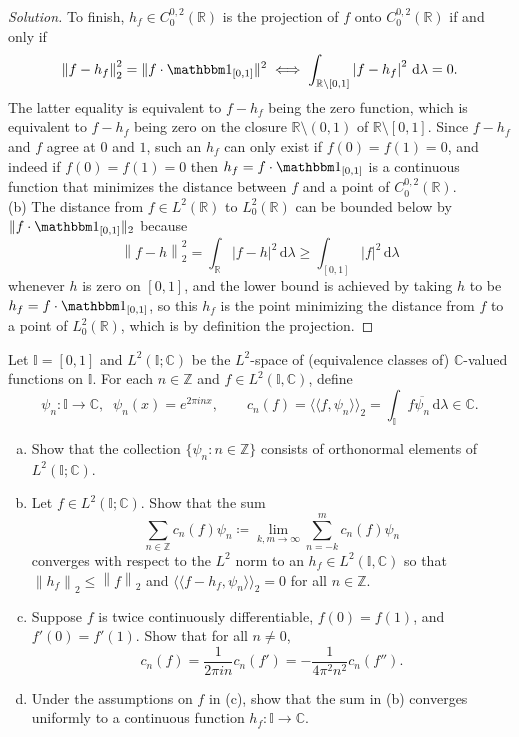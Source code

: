 \documentclass[10pt]{article}
\providecommand{\ol}{\overline}
\newcommand{\dd}{\,\mathrm{d}}
\providecommand{\CC}{\mathbb C}
\providecommand{\RR}{\mathbb R}
\providecommand{\ZZ}{\mathbb Z}
\providecommand{\ind}{\mathbbm 1}
\providecommand{\ii}{\item}
\newenvironment{soln}{\begin{proof}[Solution]}{\end{proof}}
\providecommand{\abs}[1]{\left\lvert #1\right\rvert}
\providecommand{\innerprod}[1]{\langle\!\langle #1\rangle\!\rangle}
\providecommand{\norm}[1]{\left\| #1\right\|}
\providecommand{\smnorm}[1]{\| #1\|}
\begin{document}
\begin{soln}
    To finish, $h_f\in C_0^{0,2}(\RR)$ is the projection of $f$ onto $C_0^{0,2}(\RR)$
    if and only if
    \begin{equation*}
	\norm{f-h_f}_2^2 = \smnorm{f\cdot\ind_{[0,1]}}^2
	\iff \int_{\RR\setminus[0,1]} \abs{f-h_f}^2\dd\lambda = 0.
    \end{equation*}
    The latter equality is equivalent to $f-h_f$ being the zero function,
    which is equivalent to $f-h_f$ being zero
    on the closure $\RR\setminus(0,1)$ of $\RR\setminus[0,1]$.
    Since $f-h_f$ and $f$ agree at $0$ and $1$, such an $h_f$
    can only exist if $f(0) = f(1) = 0$,
    and indeed if $f(0) = f(1) = 0$ then $h_f = f\cdot\ind_{[0,1]}$
    is a continuous function that
    minimizes the distance between $f$ and a point of $C_0^{0,2}(\RR)$.
    \\

    (b) The distance from $f\in L^2(\RR)$ to $L_0^2(\RR)$
    can be bounded below by $\smnorm{f\cdot\ind_{[0,1]}}_2$ because
    \[
	\norm{f-h}_2^2 = \int_\RR\abs{f-h}^2\dd\lambda
	\ge \int_{[0,1]} \abs{f}^2\dd\lambda
    \]
    whenever $h$ is zero on $[0,1]$,
    and the lower bound is achieved by taking $h$
    to be $h_f = f\cdot\ind_{[0,1]}$, so this $h_f$ is the point
    minimizing the distance from $f$ to a point of $L_0^2(\RR)$,
    which is by definition the projection.
\end{soln}

\begin{problem}
    Let $\mathbb I = [0,1]$ and $L^2(\mathbb I;\CC)$ be the $L^2$-space
    of (equivalence classes of) $\CC$-valued functions on $\mathbb I$.
    For each $n\in\ZZ$ and $f\in L^2(\mathbb I,\CC)$, define
    \begin{equation}
	\psi_n\colon\mathbb I\to\CC,\;\;\psi_n(x) = e^{2\pi i nx},\qquad
	c_n(f) = \innerprod{f,\psi_n}_2
	= \int_{\mathbb I} f\ol{\psi_n}\dd\lambda\in\CC.
	\label{eq:p4-assumptions}
    \end{equation}
    \begin{enumerate}[(a)]
	\ii Show that the collection $\{\psi_n : n\in\ZZ\}$
	consists of orthonormal elements of $L^2(\mathbb I;\CC)$.
	\ii Let $f\in L^2(\mathbb I;\CC)$. Show that the sum
	\begin{equation*}
	    \sum_{n\in\ZZ} c_n(f)\psi_n\coloneq
	    \lim_{k,m\to\infty}\sum_{n=-k}^m c_n(f)\psi_n
	\end{equation*}
	converges with respect to the $L^2$ norm
	to an $h_f\in L^2(\mathbb I,\CC)$ so that
	$\norm{h_f}_2\le\norm{f}_2$ and
	$\innerprod{f-h_f,\psi_n}_2 = 0$ for all $n\in\ZZ$.
	\ii Suppose $f$ is twice continuously differentiable,
	$f(0) = f(1)$, and $f'(0) = f'(1)$. Show that for all $n\ne 0$,
	\begin{equation*}
	    c_n(f) = \frac 1{2\pi in}c_n(f')
	    = -\frac 1{4\pi^2 n^2}c_n(f'').
	\end{equation*}
	\ii Under the assumptions on $f$ in (c), show that the sum in (b)
	converges uniformly to a continuous function $h_f\colon\mathbb I\to\CC$.
\end{enumerate}
\end{problem}
\end{document}
